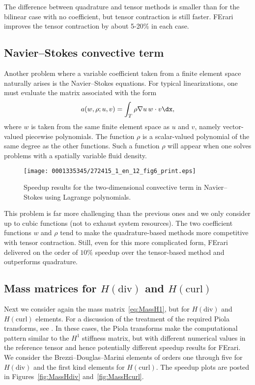 The difference between quadrature and tensor methods is smaller than
for the bilinear case with no coefficient, but tensor contraction is
still faster. FErari improves the tensor contraction by about 5-20\%
in each case.

\subsection{Navier--Stokes convective term}
Another problem where a variable coefficient taken from a finite
element space naturally arises is the Navier--Stokes equations. For
typical linearizations, one must evaluate the matrix associated with
the form\vspace*{4pt}
\begin{equation}
a(w, \rho; u, v) = \int_T \rho \nabla u \, w \cdot v \dx,\vspace*{2pt}
\end{equation}
where $w$ is taken from the same finite element space as $u$ and $v$, namely vector-valued piecewise polynomials. The function $\rho$ is a
scalar-valued polynomial of the same degree as the other
functions. Such a function $\rho$ will appear when one solves
problems with a spatially variable fluid density.

\begin{figure}
\bwfig
  \centering
  \texttt{[image: 0001335345/272415\_1\_en\_12\_fig6\_print.eps]}
  \caption{Speedup results for the two-dimensional convective term
    in Navier--Stokes using Lagrange polynomials.}
  \label{fig:NavierStokes}
\end{figure}

This problem is far more challenging than the previous ones and we
only consider up to cubic functions (not to exhaust system
resources). The two coefficient functions $ w $ and $ \rho $ tend to
make the quadrature-based methods more competitive with tensor
contraction.  Still, even for this more complicated form, FErari
delivered on the order of $ 10\% $ speedup over the tensor-based
method and outperforms quadrature.


\subsection{Mass matrices for $H(\mathrm{div})$ and $H(\mathrm{curl})$}

Next we consider again the mass matrix~\eqref{eq:MassH1}, but for $
H(\mathrm{div})$ and $H(\mathrm{curl})$ elements. For a discussion of
the treatment of the required Piola transforms,
see \citet{RognesKirbyLogg2009}. In these cases, the Piola transforms
make the computational pattern similar to the $ H^1 $ stiffness
matrix, but with different numerical values in the reference tensor
and hence potentially different speedup results for FErari. We
consider the Brezzi--Douglas--Marini elements of orders one through
five for $H(\mathrm{div})$ and the first kind \nedelec{} elements
for $H(\mathrm{curl}) $. The speedup plots are posted in
Figures~\ref{fig:MassHdiv} and~\ref{fig:MassHcurl}.

